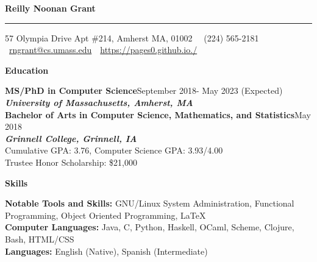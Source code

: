 \documentclass[9pt]{extarticle}
\begin{document}
\sffamily
\begin{huge}
\begin{center}
\textbf{Reilly Noonan Grant}
\end{center}
\end{huge}
\rule{19cm}{0.4pt}
\begin{center}
  57 Olympia Drive Apt \#214, Amherst MA, 01002 \,
\textbullet\, (224) 565-2181 \textbullet\ \href{mailto:rngrant@cs.umass.edu}{rngrant@cs.umass.edu} \,\textbullet\, \href{https://pages0.github.io./}{https://pages0.github.io./}
\end{center}

\begin{large}
\begin{center}\textbf{Education}
\end{center}
\end{large}

\textbf{MS/PhD in Computer Science}\hfill September 2018- May 2023 (Expected)\\
\textbf{\textit{University of Massachusetts, Amherst, MA}}\\

\textbf{Bachelor of Arts in Computer Science, Mathematics, and Statistics}\hfill May 2018\\
\textbf{\textit{Grinnell College, Grinnell, IA}}\\
Cumulative GPA: 3.76, Computer Science GPA: 3.93/4.00  \\
Trustee Honor Scholarship: \$21,000 \\

\begin{large}
\begin{center}\textbf{Skills}
\end{center}
\end{large}
\textbf{Notable Tools and Skills:} GNU/Linux System Administration,
Functional Programming, Object Oriented Programming, \LaTeX  \\
\textbf{Computer Languages:} Java, C, Python, Haskell, OCaml, Scheme, Clojure, Bash,
HTML/CSS\\
\textbf{Languages:} English (Native), Spanish (Intermediate)
\end{document}
